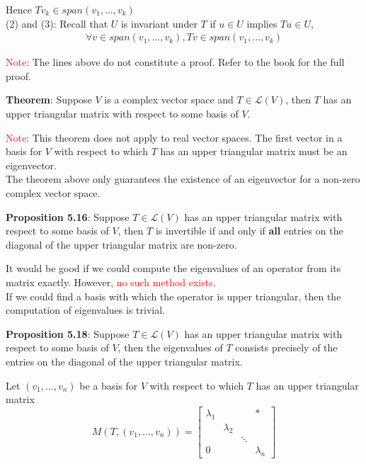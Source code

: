 \documentclass[a4paper, 10pt]{report}
\begin{document}
Hence $T v_k \in span(v_1, \hdots, v_k)$ \\

(2) and (3): Recall that  $U$ is invariant under $T$ if $u \in U$ implies  $Tu \in U$, 
 \begin{align*}
    \forall v \in span(v_1, \hdots, v_k), Tv \in span(v_1, \hdots, v_k)
\end{align*}

\textcolor{red}{Note}: The lines above do not constitute a proof. Refer to the book for the full proof.

\begin{framed}
   \textbf{Theorem}: Suppose $V$ is a complex vector space and $T \in \mathcal{L}(V)$, then  $T$ has an upper triangular matrix with respect to some basis of $V$. 
\end{framed}

\textcolor{red}{Note}: This theorem does not apply to real vector spaces. The first vector in a basis for $V$ with respect to which $T$ has an upper triangular matrix must be an eigenvector. \\

The theorem above only guarantees the existence of an eigenvector for a non-zero complex vector space. 

\begin{framed}
   \textbf{Proposition 5.16}: Suppose $T \in \mathcal{L}(V)$ has an upper triangular matrix with respect to some basis of $V$, then $T$ is invertible if and only if \textbf{all} entries on the diagonal of the upper triangular matrix are non-zero. 
\end{framed}

It would be good if we could compute the eigenvalues of an operator from its matrix exactly. However, \textcolor{red}{no such method exists}.\\

If we could find a basis with which the operator is upper triangular, then the computation of eigenvalues is trivial. \\


\begin{framed}
   \textbf{Proposition 5.18}: Suppose $T \in \mathcal{L}(V)$ has an upper triangular matrix with respect to some basis of  $V$, then the eigenvalues of $T$ consists precisely of the entries on the diagonal of the upper triangular matrix. 
\end{framed}

Let $(v_1, \hdots, v_n)$ be a basis for $V$ with respect to which $T$ has an upper triangular matrix
\[
  M(T, (v_1, \hdots, v_n)) = \begin{bmatrix} 
     \lambda_1 & & & * \\  
     & \lambda_2& &  \\  
     & & \ddots &  \\  
     0 & &  & \lambda_n 
  \end{bmatrix}
\] 
\end{document}
